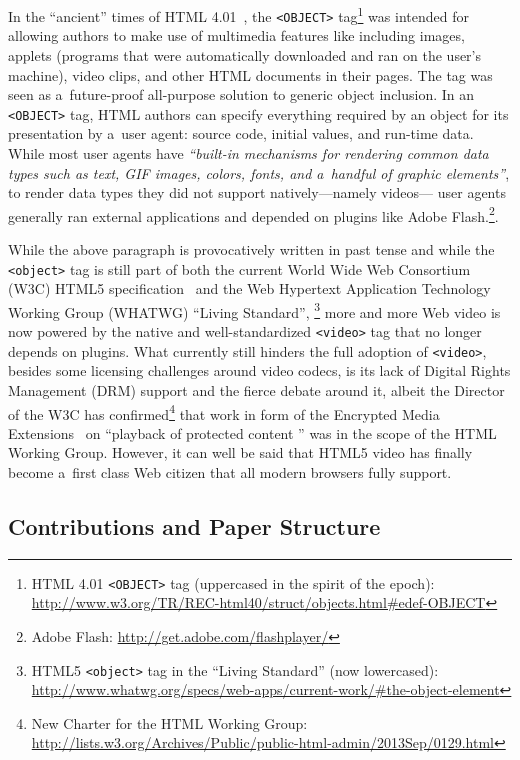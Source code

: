 \documentclass{sig-alternate}
\newcommand{\inlinelistingsize}{\fontsize{8pt}{11pt}}
\let\oldurl\url
\renewcommand{\url}[1]{\inlinelistingsize\oldurl{#1}}
\begin{document}
In the ``ancient'' times of HTML 4.01~\cite{raggett1999html401},
the \texttt{<OBJECT>} tag\footnote{HTML 4.01 \texttt{<OBJECT>} tag
(uppercased in the spirit of the epoch):
\url{http://www.w3.org/TR/REC-html40/struct/objects.html\#edef-OBJECT}}
was intended for allowing authors to make use of multimedia features
like including images, applets (programs that were automatically downloaded
and ran on the user's machine), video clips, and other HTML documents in their pages.
The tag was seen as a~future-proof all-purpose solution to generic object inclusion.
In an \texttt{<OBJECT>} tag, HTML authors can specify everything required
by an object for its presentation by a~user agent:
source code, initial values, and run-time data.
While most user agents have \textit{``built-in mechanisms
for rendering common data types such as text, GIF images,
colors, fonts, and a~handful of graphic elements''},
to render data types they did not support natively---namely videos---%
user agents generally ran external applications and depended on plugins
like Adobe Flash.\footnote{Adobe Flash:
\url{http://get.adobe.com/flashplayer/}}.

While the above paragraph is provocatively written in past tense
and while the \texttt{<object>} tag is still part of both the current
World Wide Web Consortium (W3C) HTML5 specification~\cite{berjon2013html5}
and the Web Hypertext Application Technology Working Group
(WHATWG) ``Living Standard'',%
\footnote{HTML5 \texttt{<object>} tag in the ``Living Standard'' (now lowercased):
\url{http://www.whatwg.org/specs/web-apps/current-work/\#the-object-element}} 
more and more Web video is now powered by the native and well-standardized
\texttt{<video>} tag that no longer depends on plugins.
What currently still hinders the full adoption of \texttt{<video>},
besides some licensing challenges around video codecs,
is its lack of Digital Rights Management (DRM) support
and the fierce debate around it, albeit the Director of the W3C
has confirmed\footnote{New Charter for the HTML Working Group:
\url{http://lists.w3.org/Archives/Public/public-html-admin/2013Sep/0129.html}}
that work in form of the Encrypted Media Extensions~\cite{dorwin2013eme}
on ``playback of protected content '' was in the scope of the HTML Working Group.
However, it can well be said that
HTML5 video has finally become a~first class Web citizen
that all modern browsers fully support.

\subsection{Contributions and Paper Structure}
\end{document}
